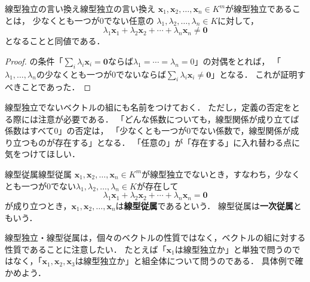 \begin{prop}{線型独立の言い換え}{線型独立の言い換え}
  $\bm{x}_1,\bm{x}_2,\dots,\bm{x}_n\in K^m$が線型独立であることは，
  少なくとも一つが$0$でない任意の
  $\lambda_1,\lambda_2,\dots,\lambda_n\in K$に対して，
  \[
    \lambda_1\bm{x}_1+\lambda_2\bm{x}_2+\cdots
    +\lambda_n\bm{x}_n\ne\bm{0}
  \]
  となることと同値である．
\end{prop}

\begin{tleftbar}
\begin{proof}
  の条件「$\sum_i \lambda_i \bm{x}_i = \bm{0}$ならば$\lambda_1 = \cdots = \lambda_n = 0$」の対偶をとれば，
  「$\lambda_1, \dots, \lambda_n$の少なくとも一つが$0$でないならば$\sum_i \lambda_i \bm{x}_i \ne \bm{0}$」となる．
  これが証明すべきことであった．
\end{proof}
\end{tleftbar}

線型独立でないベクトルの組にも名前をつけておく．
ただし，定義の否定をとる際には注意が必要である．
「どんな係数についても，線型関係が成り立てば係数はすべて$0$」の否定は，
「少なくとも一つが$0$でない係数で，線型関係が成り立つものが存在する」となる．
「任意の」が「存在する」に入れ替わる点に気をつけてほしい．

\begin{definition}{線型従属}{線型従属}
  $\bm{x}_1, \bm{x}_2, \dots, \bm{x}_n \in K^m$が線型独立でないとき，すなわち，少なくとも一つが$0$でない$\lambda_1, \lambda_2, \dots, \lambda_n \in K$が存在して
  \[
    \lambda_1 \bm{x}_1 + \lambda_2 \bm{x}_2 + \cdots + \lambda_n \bm{x}_n = \bm{0}
  \]
  が成り立つとき，$\bm{x}_1, \bm{x}_2, \dots, \bm{x}_n$は\textbf{線型従属}であるという．
  線型従属は\textbf{一次従属}ともいう．
\end{definition}

線型独立・線型従属は，個々のベクトルの性質ではなく，ベクトルの組に対する性質であることに注意したい．
たとえば「$\bm{x}_1$は線型独立か」と単独で問うのではなく，「$\bm{x}_1, \bm{x}_2, \bm{x}_3$は線型独立か」と組全体について問うのである．
具体例で確かめよう．

